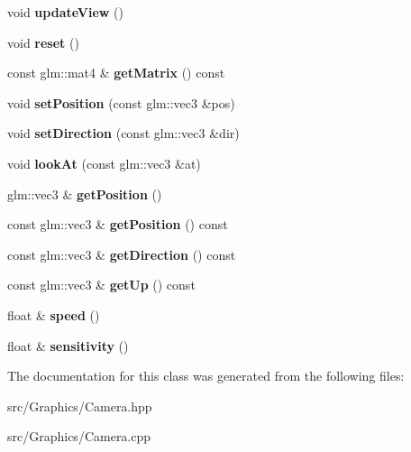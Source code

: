\begin{DoxyCompactItemize}
\item 
\hypertarget{class_camera_a84fd8b7dc4e2f00fb0bb43c462bfc71d}{void {\bfseries update\+View} ()}\label{class_camera_a84fd8b7dc4e2f00fb0bb43c462bfc71d}

\item 
\hypertarget{class_camera_a02be8aa0dbef77e02dddc715a726fb67}{void {\bfseries reset} ()}\label{class_camera_a02be8aa0dbef77e02dddc715a726fb67}

\item 
\hypertarget{class_camera_afa9614890e5e4d2613a940381a5d1863}{const glm\+::mat4 \& {\bfseries get\+Matrix} () const }\label{class_camera_afa9614890e5e4d2613a940381a5d1863}

\item 
\hypertarget{class_camera_ab7ebcdd5020d8057f1df3bdb33bac456}{void {\bfseries set\+Position} (const glm\+::vec3 \&pos)}\label{class_camera_ab7ebcdd5020d8057f1df3bdb33bac456}

\item 
\hypertarget{class_camera_ad4740221f8d5cb38d7723dbbf2493f1c}{void {\bfseries set\+Direction} (const glm\+::vec3 \&dir)}\label{class_camera_ad4740221f8d5cb38d7723dbbf2493f1c}

\item 
\hypertarget{class_camera_a1a371757084da11766d4efec19d5092f}{void {\bfseries look\+At} (const glm\+::vec3 \&at)}\label{class_camera_a1a371757084da11766d4efec19d5092f}

\item 
\hypertarget{class_camera_ae206a19d576b3292b63d47581a7aa955}{glm\+::vec3 \& {\bfseries get\+Position} ()}\label{class_camera_ae206a19d576b3292b63d47581a7aa955}

\item 
\hypertarget{class_camera_ac3f20f73b8e37f445da786bfe9e33690}{const glm\+::vec3 \& {\bfseries get\+Position} () const }\label{class_camera_ac3f20f73b8e37f445da786bfe9e33690}

\item 
\hypertarget{class_camera_a098942f443a5a7edfe21f4ccd680efc8}{const glm\+::vec3 \& {\bfseries get\+Direction} () const }\label{class_camera_a098942f443a5a7edfe21f4ccd680efc8}

\item 
\hypertarget{class_camera_a8369f3a557efe04e62e8abe81aa4cf77}{const glm\+::vec3 \& {\bfseries get\+Up} () const }\label{class_camera_a8369f3a557efe04e62e8abe81aa4cf77}

\item 
\hypertarget{class_camera_a73962ae24996182b70373639ee80e653}{float \& {\bfseries speed} ()}\label{class_camera_a73962ae24996182b70373639ee80e653}

\item 
\hypertarget{class_camera_a4c6077aea1f998143942d0e1b28d1ddb}{float \& {\bfseries sensitivity} ()}\label{class_camera_a4c6077aea1f998143942d0e1b28d1ddb}

\end{DoxyCompactItemize}


The documentation for this class was generated from the following files\+:\begin{DoxyCompactItemize}
\item 
src/\+Graphics/Camera.\+hpp\item 
src/\+Graphics/Camera.\+cpp\end{DoxyCompactItemize}
